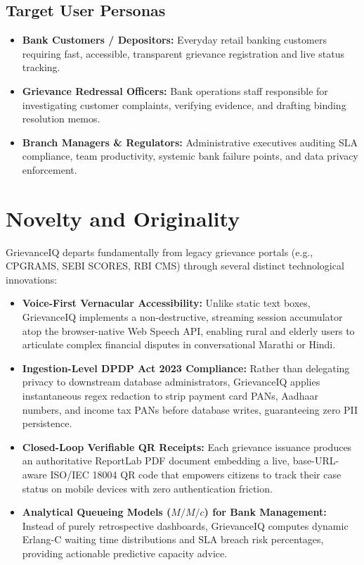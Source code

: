 \subsection{Target User Personas}
\begin{itemize}
    \item \textbf{Bank Customers / Depositors:} Everyday retail banking customers requiring fast, accessible, transparent grievance registration and live status tracking.
    \item \textbf{Grievance Redressal Officers:} Bank operations staff responsible for investigating customer complaints, verifying evidence, and drafting binding resolution memos.
    \item \textbf{Branch Managers \& Regulators:} Administrative executives auditing SLA compliance, team productivity, systemic bank failure points, and data privacy enforcement.
\end{itemize}

\section{Novelty and Originality}
GrievanceIQ departs fundamentally from legacy grievance portals (e.g., CPGRAMS, SEBI SCORES, RBI CMS) through several distinct technological innovations:
\begin{itemize}
    \item \textbf{Voice-First Vernacular Accessibility:} Unlike static text boxes, GrievanceIQ implements a non-destructive, streaming session accumulator atop the browser-native Web Speech API, enabling rural and elderly users to articulate complex financial disputes in conversational Marathi or Hindi.
    \item \textbf{Ingestion-Level DPDP Act 2023 Compliance:} Rather than delegating privacy to downstream database administrators, GrievanceIQ applies instantaneous regex redaction to strip payment card PANs, Aadhaar numbers, and income tax PANs before database writes, guaranteeing zero PII persistence.
    \item \textbf{Closed-Loop Verifiable QR Receipts:} Each grievance issuance produces an authoritative ReportLab PDF document embedding a live, base-URL-aware ISO/IEC 18004 QR code that empowers citizens to track their case status on mobile devices with zero authentication friction.
    \item \textbf{Analytical Queueing Models ($M/M/c$) for Bank Management:} Instead of purely retrospective dashboards, GrievanceIQ computes dynamic Erlang-C waiting time distributions and SLA breach risk percentages, providing actionable predictive capacity advice.
\end{itemize}

